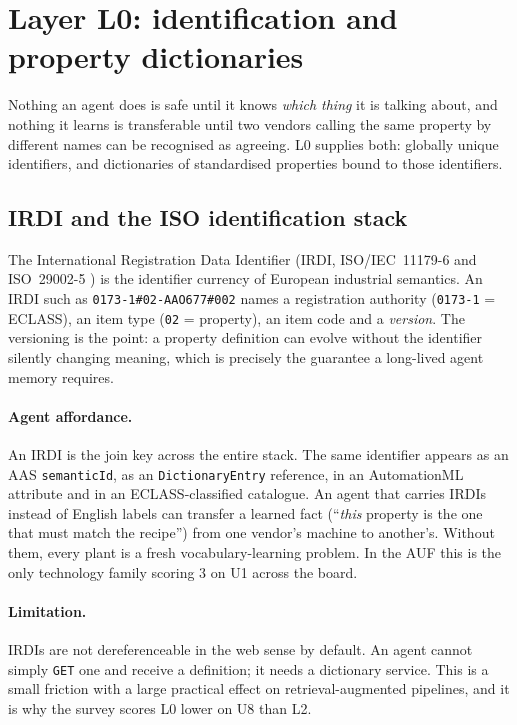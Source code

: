 \section{Layer L0: identification and property dictionaries}
\label{sec:layer0}

Nothing an agent does is safe until it knows \emph{which thing} it is talking
about, and nothing it learns is transferable until two vendors calling the same
property by different names can be recognised as agreeing. L0 supplies both:
globally unique identifiers, and dictionaries of standardised properties bound
to those identifiers.

\subsection{IRDI and the ISO identification stack}

The International Registration Data Identifier (IRDI, ISO/IEC~11179-6 and
ISO~29002-5 \cite{iso29002}) is the identifier currency of European industrial
semantics. An IRDI such as \texttt{0173-1\#02-AAO677\#002} names a registration
authority (\texttt{0173-1} = ECLASS), an item type (\texttt{02} = property), an
item code and a \emph{version}. The versioning is the point: a property definition can
evolve without the identifier silently changing meaning, which is precisely the
guarantee a long-lived agent memory requires.

\paragraph{Agent affordance.} An IRDI is the join key across the entire stack.
The same identifier appears as an AAS \texttt{semanticId}, as an \opcua{}
\texttt{DictionaryEntry} reference, in an AutomationML attribute and in an
ECLASS-classified catalogue. An agent that carries IRDIs instead of English
labels can transfer a learned fact (``\emph{this} property is the one that must
match the recipe'') from one vendor's machine to another's. Without them, every
plant is a fresh vocabulary-learning problem. In the AUF this is the only
technology family scoring $3$ on U1 across the board.

\paragraph{Limitation.} IRDIs are not dereferenceable in the web sense by
default. An agent cannot simply \texttt{GET} one and receive a definition; it
needs a dictionary service. This is a small friction with a large practical
effect on retrieval-augmented pipelines, and it is why the survey scores
L0 lower on U8 than L2.

